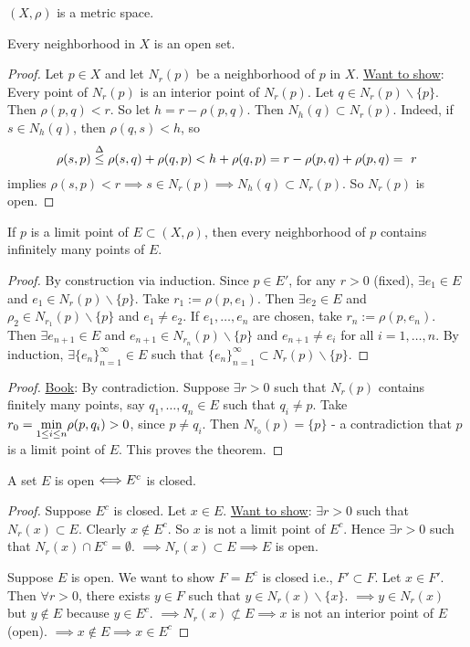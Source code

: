 \documentclass[]{article}
\begin{document}
$(X,\rho)$ is a metric space.

\begin{theorem}
	Every neighborhood in $X$ is an open set.
\end{theorem}
\begin{proof}
	Let $p\in X$ and let $N_r(p)$ be a neighborhood of $p$ in $X$.
	\ul{Want to show}: Every point of $N_r(p)$ is an interior point of $N_r(p)$.
	Let $q\in N_r(p)\backslash\{p\}$. Then $\rho(p,q)<r$. So let $h = r-\rho(p,q)$.
	Then $N_h(q)\subset N_r(p)$. Indeed, if $s\in N_h(q)$, then $\rho(q,s)<h$, so 
	$$\rho(s,p) \overset{\Delta}{\leq} \rho(s,q)+\rho(q,p) < h+ \rho(q,p) = r-\rho(p,q)+\rho(p,q) =~r$$
	implies $\rho(s,p) < r \implies s\in N_r(p) \implies N_h(q) \subset N_r(p)$.
	So $N_r(p)$ is open.
\end{proof}

\begin{theorem}
	If $p$ is a limit point of $E\subset (X,\rho)$, then every neighborhood of $p$ contains infinitely many points of $E$.
\end{theorem}
\begin{proof}
	By construction via induction. Since $p\in E'$, for any $r>0$ (fixed), $\exists e_1\in E$ and $e_1\in N_r(p)\backslash\{p\}$.
	Take $r_1 := \rho(p,e_1)$. Then $\exists e_2\in E$ and $\rho_2\in N_{r_1}(p)\backslash\{p\}$ and $e_1\neq e_2$.
	If $e_1,\dots,e_n$ are chosen, take $r_n:=\rho(p,e_n)$. Then $\exists e_{n+1}\in E$ and $e_{n+1}\in N_{r_n}(p)\backslash\{p\}$ and $e_{n+1}\neq e_i$ for all $i=1,\dots, n$.
	By induction, $\exists \{e_n\}_{n=1}^\infty\in E$ such that $\{e_n\}_{n=1}^\infty \subset N_r(p)\backslash\{p\}$.
\end{proof}
\begin{proof}
	\ul{Book}: By contradiction.
	Suppose $\exists r>0$ such that $N_r(p)$ contains finitely many points, say $q_1,\dots,q_n\in E$ such that $q_i\neq p$.
	Take $r_0 = \underset{1\leq i \leq n}{\min} \rho(p,q_i) > 0$, since $p\neq q_i$.
	Then $N_{r_0}(p) = \{p\}$ - a contradiction that $p$ is a limit point of $E$. This proves the theorem.
\end{proof}

\newpage

\begin{theorem}
	A set $E$ is open $\Longleftrightarrow E^c$ is closed.
\end{theorem}
\begin{proof}
	\say{$\Lla$} Suppose $E^c$ is closed. Let $x\in E$.
	\ul{Want to show}: $\exists r>0$ such that $N_r(x)\subset E$.
	Clearly $x\notin E^c$. So $x$ is not a limit point of $E^c$.
	Hence $\exists r>0$ such that $N_r(x)\cap E^c = \emptyset$.
	$\implies N_r(x) \subset E \implies E$ is open.

	\say{$\implies$} Suppose $E$ is open. We want to show $F=E^c$ is closed i.e., $F'\subset F$.
	Let $x\in F'$. Then $\forall r>0$, there exists $y\in F$ such that $y\in N_r(x)\backslash\{x\}$.
	$\implies y\in N_r(x)$ but $y\notin E$ because $y\in E^c$.
	$\implies N_r(x)\not\subset E \implies x$ is not an interior point of $E$ (open).
	$\implies x\notin E \implies x\in E^c$
\end{proof}
\end{document}
